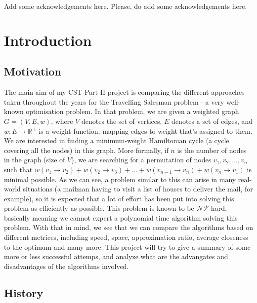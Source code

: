 \documentclass[12pt,twoside,notitlepage]{report}
\begin{document}
Add some acknowledgements here. Please, do add some acknowledgements here.


\cleardoublepage        %

\setcounter{page}{1}
\pagestyle{headings}

\chapter{Introduction}

\section{Motivation}

The main aim of my CST Part II project is comparing the different approaches taken throughout the years for the Travelling Salesman problem - a very well-known optimisation problem. In that problem, we are given a weighted graph $G = (V, E, w)$, where $V$ denotes the set of vertices, $E$ denotes a set of edges, and $w : E \rightarrow \mathbb{R}^{+}$ is a weight function, mapping edges to weight that's assigned to them. We are interested in finding a minimum-weight Hamiltonian cycle (a cycle covering all the nodes) in this graph. More formally, if $n$ is the number of nodes in the graph (size of $V$), we are searching for a permutation of nodes $v_1, v_2, \dots, v_{n}$ such that $w(v_1 \rightarrow v_2) + w(v_2 \rightarrow v_3) + \dots + w(v_{n-1} \rightarrow v_n) + w(v_n \rightarrow v_1)$ is minimal possible. As we can see, a problem similar to this can arise in many real-world situations (a mailman having to visit a list of houses to deliver the mail, for example), so it is expected that a lot of effort has been put into solving this problem as efficiently as possible. This problem is known to be $\mathcal{NP}$-hard, basically meaning we cannot expert a polynomial time algorithm solving this problem. With that in mind, we see that we can compare the algorithms based on different metrices, including speed, space, approximation ratio, average closeness to the optimum and many more. This project will try to give a summary of some more or less successful attemps, and analyze what are the advangates and disadvantages of the algorithms involved.

\section{History} 
\end{document}
